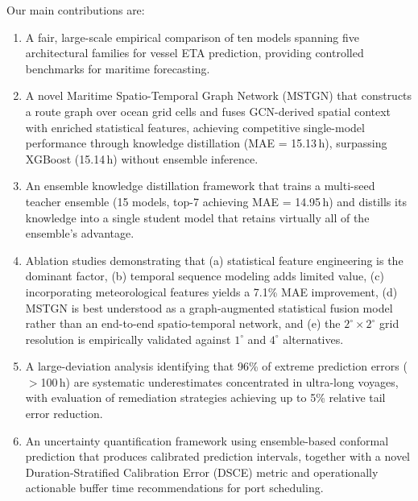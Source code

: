 \documentclass[conference]{IEEEtran}
\begin{document}
Our main contributions are:
\begin{enumerate}
    \item A fair, large-scale empirical comparison of ten models spanning five architectural families for vessel ETA prediction, providing controlled benchmarks for maritime forecasting.
    \item A novel Maritime Spatio-Temporal Graph Network (MSTGN) that constructs a route graph over ocean grid cells and fuses GCN-derived spatial context with enriched statistical features, achieving competitive single-model performance through knowledge distillation (MAE = 15.13\,h), surpassing XGBoost (15.14\,h) without ensemble inference.
    \item An ensemble knowledge distillation framework that trains a multi-seed teacher ensemble (15 models, top-7 achieving MAE = 14.95\,h) and distills its knowledge into a single student model that retains virtually all of the ensemble's advantage.
    \item Ablation studies demonstrating that (a) statistical feature engineering is the dominant factor, (b) temporal sequence modeling adds limited value, (c) incorporating meteorological features yields a 7.1\% MAE improvement, (d) MSTGN is best understood as a graph-augmented statistical fusion model rather than an end-to-end spatio-temporal network, and (e) the $2^\circ{\times}2^\circ$ grid resolution is empirically validated against $1^\circ$ and $4^\circ$ alternatives.
    \item A large-deviation analysis identifying that 96\% of extreme prediction errors ($>$100\,h) are systematic underestimates concentrated in ultra-long voyages, with evaluation of remediation strategies achieving up to 5\% relative tail error reduction.
    \item An uncertainty quantification framework using ensemble-based conformal prediction that produces calibrated prediction intervals, together with a novel Duration-Stratified Calibration Error (DSCE) metric and operationally actionable buffer time recommendations for port scheduling.
\end{enumerate}
\end{document}
